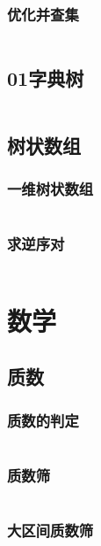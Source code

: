 \documentclass[a4paper,11pt]{article}
\begin{document}
\subsubsection{优化并查集}
\inputminted[breaklines,linenos,frame=leftline]{c++}{DataStruct/disjoint1.cpp}

\subsection{01字典树}
\inputminted[breaklines,linenos,frame=leftline]{c++}{DataStruct/trie.cpp}

\subsection{树状数组}
\subsubsection{一维树状数组}
\inputminted[breaklines,linenos,frame=leftline]{c++}{DataStruct/BIT1.cpp}
\subsubsection{求逆序对}
\inputminted[breaklines,linenos,frame=leftline]{c++}{DataStruct/BIT2.cpp}


\newpage
\section{数学}

\subsection{质数}
\subsubsection{质数的判定}
\inputminted[breaklines,linenos,frame=leftline]{c++}{math/prime1.cpp}
\subsubsection{质数筛}
\inputminted[breaklines,linenos,frame=leftline]{c++}{math/prime2.cpp}
\subsubsection{大区间质数筛}
\inputminted[breaklines,linenos,frame=leftline]{c++}{math/prime3.cpp}
\end{document}
